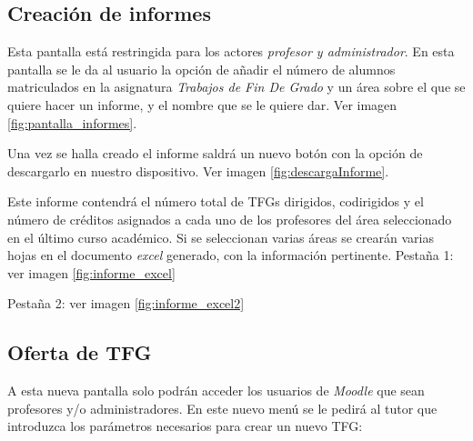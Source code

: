 \subsection{Creación de informes}
Esta pantalla está restringida para los actores \emph{profesor y administrador}.
En esta pantalla se le da al usuario la opción de añadir el número de alumnos matriculados en la asignatura \emph{Trabajos de Fin De Grado} y un área sobre el que se quiere hacer un informe, y el nombre que se le quiere dar. 
Ver imagen \ref{fig:pantalla_informes}.


Una vez se halla creado el informe saldrá un nuevo botón con la opción de descargarlo en nuestro dispositivo. Ver imagen \ref{fig:descargaInforme}.


Este informe contendrá el número total de TFGs dirigidos, codirigidos y el número de créditos asignados a cada uno de los profesores del área seleccionado en el último curso académico. Si se seleccionan varias áreas se crearán varias hojas en el documento \emph{excel} generado, con la información pertinente. 
Pestaña 1: ver imagen \ref{fig:informe_excel}

Pestaña 2: ver imagen \ref{fig:informe_excel2}

\subsection{Oferta de TFG}

A esta nueva pantalla solo podrán acceder los usuarios de \emph{Moodle} que sean profesores y/o administradores.
En este nuevo menú se le pedirá al tutor que introduzca los parámetros necesarios para crear un nuevo TFG:

